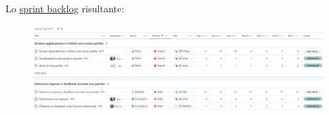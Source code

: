 
Lo \href{https://github.com/orgs/ISIQuiz/projects/3/views/16}{sprint backlog} risultante:

\begin{figure}[H]
    \centering
    \includegraphics[width=\textwidth]{process/Img/Sprint5BL.jpg}
    \label{fig:Sprint5BL}
\end{figure}